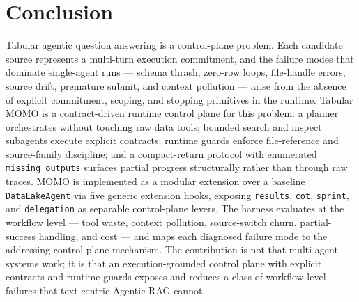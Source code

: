 \section{Conclusion}
\label{sec:conclusion}

Tabular agentic question answering is a control-plane problem. Each candidate source represents a multi-turn execution commitment, and the failure modes that dominate single-agent runs --- schema thrash, zero-row loops, file-handle errors, source drift, premature submit, and context pollution --- arise from the absence of explicit commitment, scoping, and stopping primitives in the runtime. Tabular MOMO is a contract-driven runtime control plane for this problem: a planner orchestrates without touching raw data tools; bounded search and inspect subagents execute explicit contracts; runtime guards enforce file-reference and source-family discipline; and a compact-return protocol with enumerated \texttt{missing\_outputs} surfaces partial progress structurally rather than through raw traces. MOMO is implemented as a modular extension over a baseline \texttt{DataLakeAgent} via five generic extension hooks, exposing \texttt{results}, \texttt{cot}, \texttt{sprint}, and \texttt{delegation} as separable control-plane levers. The harness evaluates at the workflow level --- tool waste, context pollution, source-switch churn, partial-success handling, and cost --- and maps each diagnosed failure mode to the addressing control-plane mechanism. The contribution is not that multi-agent systems work; it is that an execution-grounded control plane with explicit contracts and runtime guards exposes and reduces a class of workflow-level failures that text-centric Agentic RAG cannot.
